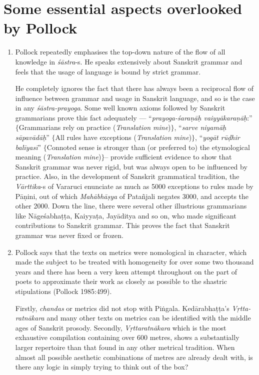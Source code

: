 \section*{Some essential aspects overlooked by Pollock}

\begin{enumerate}
\item Pollock repeatedly emphasises the top-down nature of the flow of all knowledge in {\it śāstra}-s. He speaks extensively about Sanskrit grammar and feels that the usage of language is bound by strict grammar. 

He completely ignores the fact that there has always been a reciprocal flow of influence between grammar and usage in Sanskrit language, and so is the case in any \textit{śāstra-prayoga}. Some well known axioms followed by Sanskrit grammarians prove this fact adequately --- ``\textit{prayoga-śaraṇāḥ vaiyyākaraṇāḥ}:'' $\{$Grammarians rely on practice (\textit{Translation mine})$\}$, ``\textit{sarve niyamāḥ sāpavādāḥ}'' $\{$All rules have exceptions (\textit{Translation mine})$\}$, ``\textit{yogāt rūḍhir balīyasī}'' $\{$Connoted sense is stronger than (or preferred to) the etymological meaning (\textit{Translation mine})$\}$-- provide sufficient evidence to show that Sanskrit grammar was never rigid, but was always open to be influenced by practice. Also, in the development of Sanskrit grammatical tradition, the  {\it Vārttika}-s of Vararuci enunciate as much as 5000 exceptions to rules made by Pāṇini, out of which {\it Mahābhāṣya} of Patañjali negates 3000, and accepts the other 2000. Down the line, there were several other illustrious grammarians like Nāgeśabhaṭṭa, Kaiyyaṭa,  Jayāditya and so on, who made significant contributions to Sanskrit grammar. This proves the fact that Sanskrit grammar  was never fixed or frozen.

\item Pollock says that the texts on metrics were nomological in character, which made the subject to be treated with homogeneity for over some two thousand years and there has been a very keen attempt throughout on the part of poets to approximate their work as closely as possible to the shastric stipulations (Pollock 1985:499). 

Firstly, {\it chandas} or metrics did not stop with Piṅgala. Kedārabhaṭṭa's \textit{Vṛtta-ratnākara} and many other texts on metrics can be identified with the middle ages of Sanskrit prosody. Secondly, {\it Vṛttaratnākara} which is the most exhaustive compilation containing over 600 metres,  shows a substantially larger repertoire than that found in any other metrical tradition. When almost all possible aesthetic combinations of metres are already dealt with, is there any logic in simply trying to think out of the box?  


\end{enumerate}
